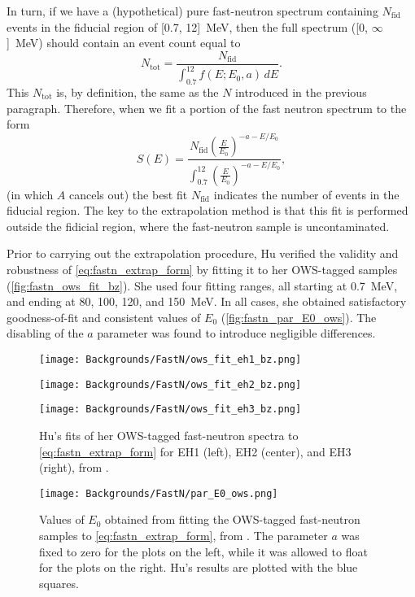 \documentclass[../thesis.tex]{subfiles}
\begin{document}
In turn, if we have a (hypothetical) pure fast-neutron spectrum containing $N_\mathrm{fid}$ events in the fiducial region of [0.7, 12]~MeV, then the full spectrum ([0, $\infty$]~MeV) should contain an event count equal to
\[ N_\mathrm{tot} = \frac{N_\mathrm{fid}}{\int_{0.7}^{12} f(E; E_0, a)\,dE }. \] This $N_\mathrm{tot}$ is, by definition, the same as the $N$ introduced in the previous paragraph. Therefore, when we fit a portion of the fast neutron spectrum to the form
\begin{equation}
  \label{eq:fastn_extrap_form}
  S(E) = \frac{N_\mathrm{fid} \left( \frac{E}{E_0} \right)^{-a-E/E_0}}
  {\int_{0.7}^{12} \left( \frac{E}{E_0} \right)^{-a-E/E_0} },
\end{equation}
(in which $A$ cancels out) the best fit $N_\mathrm{fid}$ indicates the number of events in the fiducial region. The key to the extrapolation method is that this fit is performed outside the fidicial region, where the fast-neutron sample is uncontaminated.

Prior to carrying out the extrapolation procedure, Hu verified the validity and robustness of \eqref{eq:fastn_extrap_form} by fitting it to her OWS-tagged samples (\autoref{fig:fastn_ows_fit_bz}). She used four fitting ranges, all starting at 0.7~MeV, and ending at 80, 100, 120, and 150~MeV. In all cases, she obtained satisfactory goodness-of-fit and consistent values of $E_0$ (\autoref{fig:fastn_par_E0_ows}). The disabling of the $a$ parameter was found to introduce negligible differences.

\begin{figure}[ht]
  \begin{minipage}{0.333\linewidth}%
    \texttt{[image: Backgrounds/FastN/ows\_fit\_eh1\_bz.png]}%
  \end{minipage}%
  \begin{minipage}{0.333\linewidth}%
    \texttt{[image: Backgrounds/FastN/ows\_fit\_eh2\_bz.png]}%
  \end{minipage}%
  \begin{minipage}{0.333\linewidth}%
    \texttt{[image: Backgrounds/FastN/ows\_fit\_eh3\_bz.png]}%
  \end{minipage}%
  \caption{Hu's fits of her OWS-tagged fast-neutron spectra to \autoref{eq:fastn_extrap_form} for EH1 (left), EH2 (center), and EH3 (right), from \cite{fastn}.}
  \label{fig:fastn_ows_fit_bz}
\end{figure}

\begin{figure}[ht]
  \texttt{[image: Backgrounds/FastN/par\_E0\_ows.png]}
  \caption{Values of $E_0$ obtained from fitting the OWS-tagged fast-neutron samples to \autoref{eq:fastn_extrap_form}, from \cite{fastn}. The parameter $a$ was fixed to zero for the plots on the left, while it was allowed to float for the plots on the right. Hu's results are plotted with the blue squares.}
  \label{fig:fastn_par_E0_ows}
\end{figure}
\end{document}
